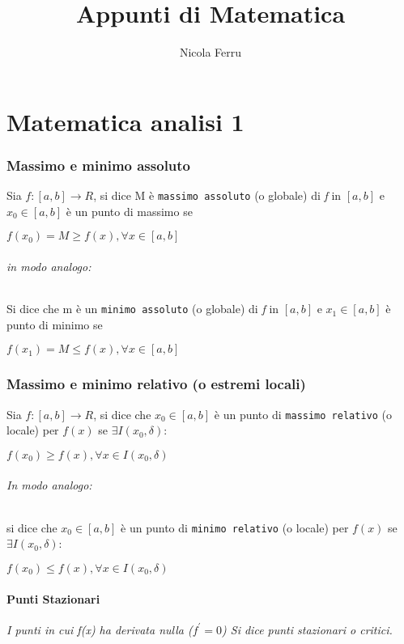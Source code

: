 \documentclass{book}
\title{Appunti di Matematica}
\author{Nicola Ferru}
\date{}
\begin{document}
\maketitle
\tableofcontents
\listoftables
\listoffigures



\part{Matematica analisi 1}


\section{Massimo e minimo assoluto}
Sia $f:[a,b]\to R$, si dice M è \texttt{massimo assoluto} (o globale) di
\textit{f} in $[a, b]$ e $x_0\in[a, b]$ è un punto di massimo se
\begin{center}
	$f(x_0)=M\geq f(x),\forall x \in [a, b]$
\end{center}
\paragraph{in modo analogo:}
Si dice che m è un \texttt{minimo assoluto} (o globale) di
\textit{f} in $[a, b]$ e $x_1\in[a, b]$ è punto di minimo se 
\begin{center}
	$f(x_1)=M\leq f(x),\forall x \in [a, b]$
\end{center}
\section{Massimo e minimo relativo (o estremi locali)}
Sia $f:[a,b]\to R$, si dice che $x_0\in[a, b]$ è un punto di \texttt{massimo
relativo} (o locale) per $f(x)$ se $\exists I (x_0,\delta)$:
\begin{center}
	$f(x_0)\geq f(x),\forall x \in I (x_0,\delta)$
\end{center}
\paragraph{In modo analogo:}
si dice che $x_0\in[a, b]$ è un punto di \texttt{minimo relativo} (o locale)
per $f(x)$ se $\exists I (x_0,\delta)$:
\begin{center}
	$f(x_0)\leq f(x),\forall x \in I (x_0,\delta)$
\end{center}
\subsection{Punti Stazionari}
\textit{I punti in cui f(x) ha derivata nulla ($f^\prime=0$) Si dice punti
stazionari o critici.}
\end{document}
